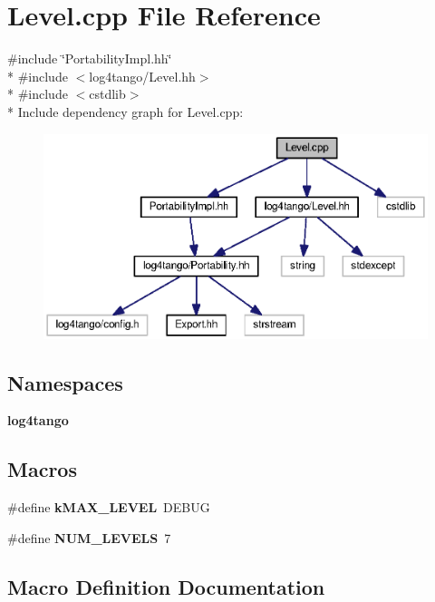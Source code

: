 \section{Level.\-cpp File Reference}
\label{Level_8cpp}
{\ttfamily \#include \char`\"{}Portability\-Impl.\-hh\char`\"{}}\\*
{\ttfamily \#include $<$log4tango/\-Level.\-hh$>$}\\*
{\ttfamily \#include $<$cstdlib$>$}\\*
Include dependency graph for Level.\-cpp\-:
\nopagebreak
\begin{figure}[H]
\begin{center}
\leavevmode
\includegraphics[width=350pt]{dd/d69/Level_8cpp__incl}
\end{center}
\end{figure}
\subsection*{Namespaces}
\begin{DoxyCompactItemize}
\item 
{\bf log4tango}
\end{DoxyCompactItemize}
\subsection*{Macros}
\begin{DoxyCompactItemize}
\item 
\#define {\bf k\-M\-A\-X\-\_\-\-L\-E\-V\-E\-L}~D\-E\-B\-U\-G
\item 
\#define {\bf N\-U\-M\-\_\-\-L\-E\-V\-E\-L\-S}~7
\end{DoxyCompactItemize}


\subsection{Macro Definition Documentation}
